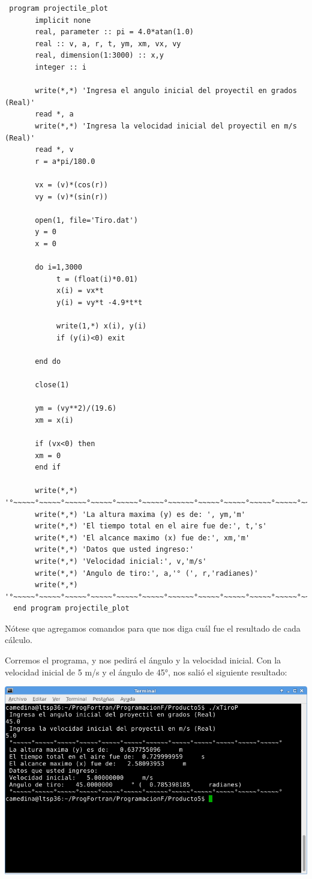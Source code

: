 \documentclass[12pt]{article}
\begin{document}
\begin{verbatim}
 program projectile_plot  
       implicit none  
       real, parameter :: pi = 4.0*atan(1.0) 
       real :: v, a, r, t, ym, xm, vx, vy
       real, dimension(1:3000) :: x,y 
       integer :: i 

       write(*,*) 'Ingresa el angulo inicial del proyectil en grados (Real)'   
       read *, a   
       write(*,*) 'Ingresa la velocidad inicial del proyectil en m/s (Real)'   
       read *, v   
       r = a*pi/180.0
     
       vx = (v)*(cos(r))
       vy = (v)*(sin(r))

       open(1, file='Tiro.dat')
       y = 0
       x = 0
       
       do i=1,3000  
            t = (float(i)*0.01)   
            x(i) = vx*t   
            y(i) = vy*t -4.9*t*t
     
            write(1,*) x(i), y(i)      
            if (y(i)<0) exit 
         
       end do

       close(1)   

       ym = (vy**2)/(19.6)
       xm = x(i)

       if (vx<0) then 
       xm = 0
       end if

       write(*,*) '°~~~~~°~~~~~°~~~~~°~~~~~°~~~~~°~~~~~°~~~~~~°~~~~~°~~~~~°~~~~~°~~~~~°~~~~~°'
       write(*,*) 'La altura maxima (y) es de: ', ym,'m'
       write(*,*) 'El tiempo total en el aire fue de:', t,'s'
       write(*,*) 'El alcance maximo (x) fue de:', xm,'m'
       write(*,*) 'Datos que usted ingreso:'
       write(*,*) 'Velocidad inicial:', v,'m/s'
       write(*,*) 'Angulo de tiro:', a,'° (', r,'radianes)'
       write(*,*) '°~~~~~°~~~~~°~~~~~°~~~~~°~~~~~°~~~~~°~~~~~~°~~~~~°~~~~~°~~~~~°~~~~~°~~~~~°'
  end program projectile_plot 
\end{verbatim}

Nótese que agregamos comandos para que nos diga cuál fue el resultado de cada cálculo.

Corremos el programa, y nos pedirá el ángulo y la velocidad inicial. Con la velocidad inicial de 5 m/s y el ángulo de 45°, nos salió el siguiente resultado:

\begin{center}
	\includegraphics[width=14cm]{Resul.png}\\
\end{center}
\end{document}

